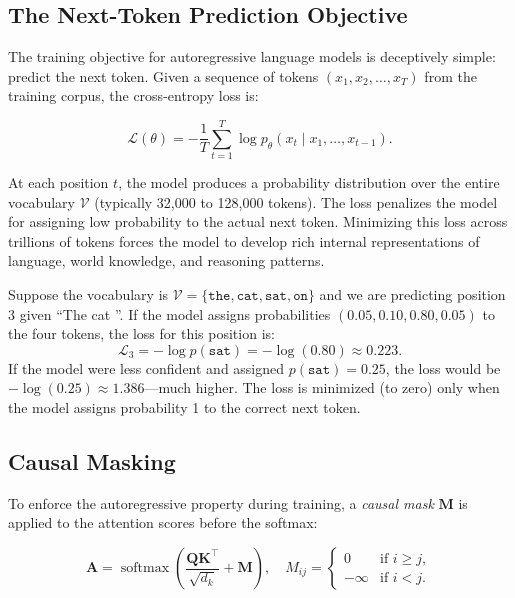 \subsection{The Next-Token Prediction Objective}
\label{sec:next-token}

The training objective for autoregressive language models is deceptively simple: predict the next token. Given a sequence of tokens $(x_1, x_2, \ldots, x_T)$ from the training corpus, the cross-entropy loss is:

\begin{equation}
\mathcal{L}(\theta) = -\frac{1}{T}\sum_{t=1}^{T} \log p_\theta(x_t \mid x_1, \ldots, x_{t-1}).
\label{eq:lm-cross-entropy}
\end{equation}

At each position $t$, the model produces a probability distribution over the entire vocabulary $\mathcal{V}$ (typically 32,000 to 128,000 tokens). The loss penalizes the model for assigning low probability to the actual next token. Minimizing this loss across trillions of tokens forces the model to develop rich internal representations of language, world knowledge, and reasoning patterns.

\begin{example}
Suppose the vocabulary is $\mathcal{V} = \{\texttt{the}, \texttt{cat}, \texttt{sat}, \texttt{on}\}$ and we are predicting position 3 given ``The cat \underline{\phantom{sat}}''. If the model assigns probabilities $(0.05, 0.10, 0.80, 0.05)$ to the four tokens, the loss for this position is:
\begin{equation}
\mathcal{L}_3 = -\log p(\texttt{sat}) = -\log(0.80) \approx 0.223.
\end{equation}
If the model were less confident and assigned $p(\texttt{sat}) = 0.25$, the loss would be $-\log(0.25) \approx 1.386$---much higher. The loss is minimized (to zero) only when the model assigns probability 1 to the correct next token.
\end{example}

\subsection{Causal Masking}

To enforce the autoregressive property during training, a \emph{causal mask} $\mathbf{M}$ is applied to the attention scores before the softmax:

\begin{equation}
\mathbf{A} = \operatorname{softmax}\!\left(\frac{\mathbf{Q}\mathbf{K}^\top}{\sqrt{d_k}} + \mathbf{M}\right), \quad M_{ij} = \begin{cases} 0 & \text{if } i \geq j, \\ -\infty & \text{if } i < j. \end{cases}
\label{eq:causal-mask}
\end{equation}

